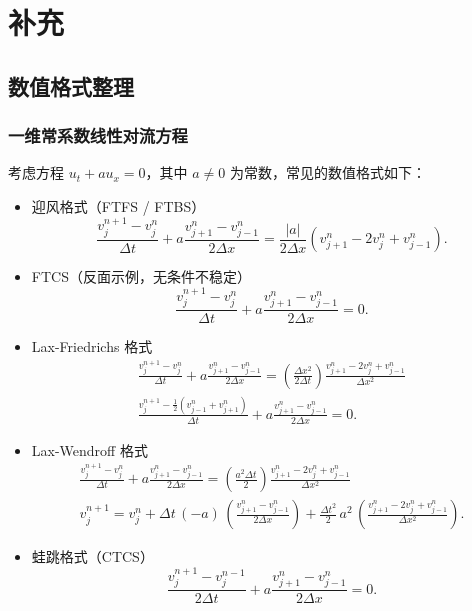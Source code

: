 \chapter{补充}

\section{数值格式整理}

\subsection*{一维常系数线性对流方程}

考虑方程 $u_t + a u_x = 0$，其中 $a \neq 0$ 为常数，常见的数值格式如下：
\begin{itemize}
    \item 迎风格式（FTFS / FTBS）
          \[
              \frac{v_j^{n+1} - v_j^n}{\Delta t} + a \frac{v_{j+1}^n - v_{j-1}^{n}}{2\Delta x} = \frac{|a|}{2\Delta x} (v_{j+1}^n - 2 v_j^n + v_{j-1}^{n}).
          \]
    \item FTCS（反面示例，无条件不稳定）
          \[
              \frac{v_{j}^{n+1} - v_{j}^n}{\Delta t} + a \frac{v_{j+1}^n - v_{j-1}^n}{2\Delta x} = 0.
          \]
    \item Lax-Friedrichs 格式
          \begin{gather*}
              \frac{v_j^{n+1}-v_j^n}{\Delta t} + a \frac{v_{j+1}^n-v_{j-1}^n}{2\Delta x} ={} \left(\frac{\Delta x^2}{2\Delta t}\right) \frac{v_{j+1}^n-2 v_j^n+v_{j-1}^n}{\Delta x^2}     \\
              \frac{v_j^{n+1}-\frac12(v_{j-1}^n+v_{j+1}^n)}{\Delta t} + a \frac{v_{j+1}^n-v_{j-1}^n}{2\Delta x} ={} 0.
          \end{gather*}
    \item Lax-Wendroff 格式
          \begin{gather*}
              \frac{v_j^{n+1}-v_j^n}{\Delta t} + a \frac{v_{j+1}^n-v_{j-1}^n}{2\Delta x} = \left(\frac{a^2 \Delta t}{2}\right) \frac{v_{j+1}^n-2 v_j^n+v_{j-1}^n}{\Delta x^2} \\
              v_{j}^{n+1} = v_j^n + \Delta t \,(-a)\,\left(\frac{v_{j+1}^n- v_{j-1}^n}{2\Delta x}\right)
              + \frac{\Delta t^2}2\,a^2\,\left(\frac{v_{j+1}^n-2v_{j}^n+v_{j-1}^n}{\Delta x^2}\right).
          \end{gather*}
    \item 蛙跳格式（CTCS）
          \[
              \frac{v_{j}^{n+1} - v_{j}^{n-1}}{2\Delta t} + a \frac{v_{j+1}^n - v_{j-1}^n}{2\Delta x} = 0.
\]
\end{itemize}
